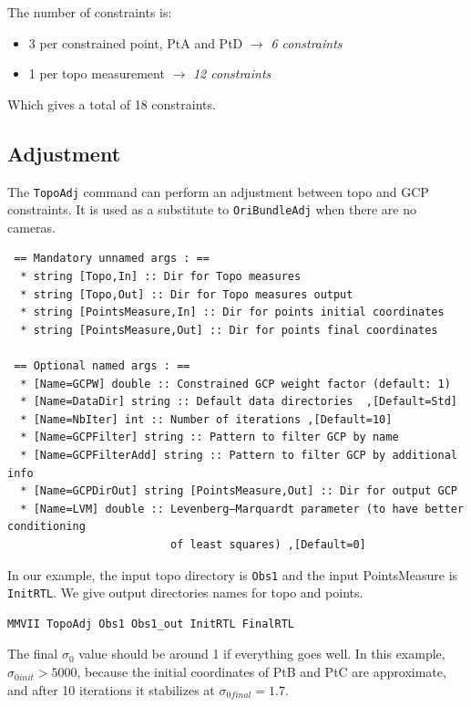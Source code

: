 The number of constraints is:
\begin{itemize}
   \item 3 per constrained point, PtA and PtD  $\rightarrow$ \textit{6 constraints}
   \item 1 per topo measurement $\rightarrow$ \textit{12 constraints}
\end{itemize}

Which gives a total of 18 constraints.


\subsection{Adjustment}
\label{subsec:TopoAdj}
The \texttt{TopoAdj} command can perform an adjustment between topo and GCP constraints.
It is used as a substitute to \texttt{OriBundleAdj} when there are no cameras.

\begin{verbatim}
 == Mandatory unnamed args : ==
  * string [Topo,In] :: Dir for Topo measures
  * string [Topo,Out] :: Dir for Topo measures output
  * string [PointsMeasure,In] :: Dir for points initial coordinates
  * string [PointsMeasure,Out] :: Dir for points final coordinates

 == Optional named args : ==
  * [Name=GCPW] double :: Constrained GCP weight factor (default: 1)
  * [Name=DataDir] string :: Default data directories  ,[Default=Std]
  * [Name=NbIter] int :: Number of iterations ,[Default=10]
  * [Name=GCPFilter] string :: Pattern to filter GCP by name
  * [Name=GCPFilterAdd] string :: Pattern to filter GCP by additional info
  * [Name=GCPDirOut] string [PointsMeasure,Out] :: Dir for output GCP
  * [Name=LVM] double :: Levenberg–Marquardt parameter (to have better conditioning
                         of least squares) ,[Default=0]
\end{verbatim}

In our example, the input topo directory is \texttt{Obs1} and the input PointsMeasure is \texttt{InitRTL}.
We give output directories names for topo and points.
\begin{lstlisting}
MMVII TopoAdj Obs1 Obs1_out InitRTL FinalRTL
\end{lstlisting}

The final $\sigma_0$ value should be around 1 if everything goes well.
In this example, $\sigma_{0 init} > 5000$, because the initial coordinates of PtB and PtC are approximate,
and after 10 iterations it stabilizes at $\sigma_{0 final} = 1.7$.
\\

